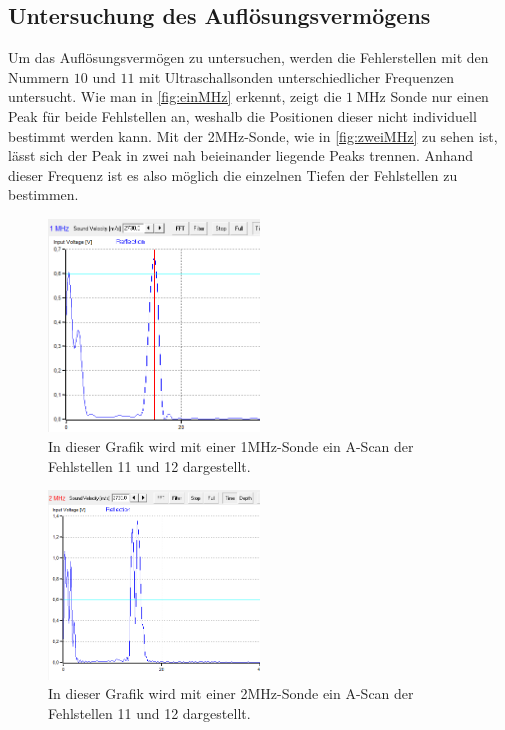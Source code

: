 \subsection{Untersuchung des Auflösungsvermögens}
\label{subsec:auflösung}
Um das Auflösungsvermögen zu untersuchen, werden die Fehlerstellen mit den Nummern $10$ und $11$ mit Ultraschallsonden unterschiedlicher Frequenzen untersucht.
Wie man in \autoref{fig:einMHz} erkennt, zeigt die $\qty{1}{\mega\hertz}$ Sonde nur einen Peak für beide Fehlstellen an, weshalb die Positionen dieser nicht individuell 
bestimmt werden kann.
Mit der 2MHz-Sonde, wie in \autoref{fig:zweiMHz} zu sehen ist, lässt sich der Peak in zwei nah beieinander liegende Peaks trennen. Anhand dieser Frequenz ist es also möglich 
die einzelnen Tiefen der Fehlstellen zu bestimmen.
\begin{figure}
  \centering
\includegraphics[width=0.5\textwidth]{content/einMHz.pdf}
  \caption{In dieser Grafik wird mit einer 1MHz-Sonde ein A-Scan der Fehlstellen 11 und 12 dargestellt.}
  \label{fig:einMHz}
\end{figure}
\begin{figure}[H]
  \centering
\includegraphics[width=0.5\textwidth]{content/2MHz (unten).pdf}
  \caption{In dieser Grafik wird mit einer 2MHz-Sonde ein A-Scan der Fehlstellen 11 und 12 dargestellt.}
  \label{fig:zweiMHz}
\end{figure}

